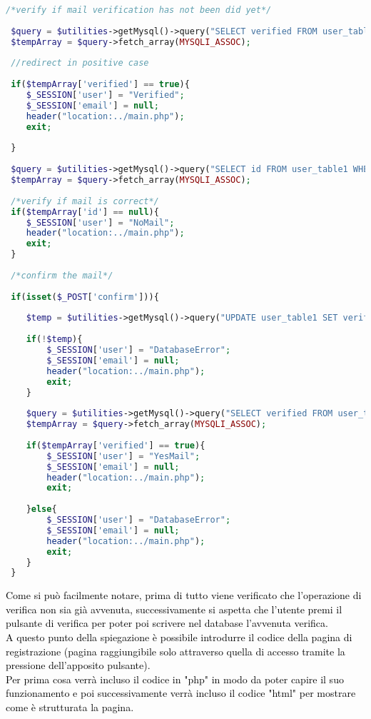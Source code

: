  \begin{lstlisting}[language=php]
 /*verify if mail verification has not been did yet*/
 
 $query = $utilities->getMysql()->query("SELECT verified FROM user_table1 WHERE (email = '{$_SESSION['email']}')");
 $tempArray = $query->fetch_array(MYSQLI_ASSOC);
 
 //redirect in positive case
 
 if($tempArray['verified'] == true){
 	$_SESSION['user'] = "Verified";
 	$_SESSION['email'] = null;
 	header("location:../main.php");
 	exit;
 	
 }
 
 $query = $utilities->getMysql()->query("SELECT id FROM user_table1 WHERE (email = '{$_SESSION['email']}')");
 $tempArray = $query->fetch_array(MYSQLI_ASSOC);
 
 /*verify if mail is correct*/
 if($tempArray['id'] == null){
 	$_SESSION['user'] = "NoMail";
 	header("location:../main.php");
 	exit;
 }
 
 /*confirm the mail*/
 
 if(isset($_POST['confirm'])){
 	
 	$temp = $utilities->getMysql()->query("UPDATE user_table1 SET verified = 1 WHERE (id = '{$tempArray['id']}')");
 	
 	if(!$temp){
 		$_SESSION['user'] = "DatabaseError";
 		$_SESSION['email'] = null;
 		header("location:../main.php");
 		exit;
 	}
 	
 	$query = $utilities->getMysql()->query("SELECT verified FROM user_table1 WHERE (email = '{$_SESSION['email']}')");
 	$tempArray = $query->fetch_array(MYSQLI_ASSOC);
 	
 	if($tempArray['verified'] == true){
 		$_SESSION['user'] = "YesMail";
 		$_SESSION['email'] = null;
 		header("location:../main.php");
 		exit;
 		
 	}else{
 		$_SESSION['user'] = "DatabaseError";
 		$_SESSION['email'] = null;
 		header("location:../main.php");
 		exit;
 	}
 }
 \end{lstlisting}
 
 \textcolor{black}{Come si può facilmente notare, prima di tutto viene verificato che l'operazione di verifica non sia già avvenuta, successivamente si aspetta che l'utente premi il pulsante di verifica per poter poi scrivere nel database l'avvenuta verifica.}\\
 
 \textcolor{black}{A questo punto della spiegazione è possibile introdurre il codice della pagina di registrazione (pagina raggiungibile solo attraverso quella di accesso tramite la pressione dell'apposito pulsante).\\
 Per prima cosa verrà incluso il codice in "php" in modo da poter capire il suo funzionamento e poi successivamente verrà incluso il codice "html" per mostrare come è strutturata la pagina.}\\
 
